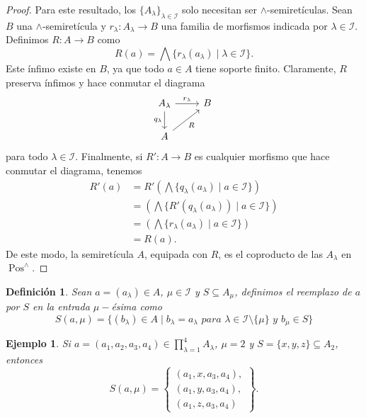 \documentclass[12pt,letterpaper,titlepage]{article}
\newtheorem*{defn}{Definición}
\newtheorem*{exa}{Ejemplo}
\theoremstyle{definition}
\renewcommand\inf{\wedge}
\newcommand\Inf{\bigwedge}
\newcommand\scr[1]{\mathscr{#1}}
\newcommand\<{\langle}
\renewcommand\>{\rangle}
\DeclareMathOperator{\Pos}{Pos}
\begin{document}
\begin{proof}
    Para este resultado, los $\{A_\lambda\}_{\lambda\in\scr I}$
    solo necesitan ser $\inf$-semiretículas.
    Sean $B$ una $\inf$-semiretícula y
    $r_\lambda:A_\lambda\to B$ una familia de morfismos
    indicada por $\lambda\in\scr I$.
    Definimos $R:A\to B$ como
    \[
        R(a) = \Inf\{r_\lambda(a_\lambda) \mid \lambda \in \scr I\}
    .\]
    Este ínfimo existe en $B$, ya que todo $a\in A$ tiene soporte
    finito.
    Claramente, $R$ preserva ínfimos y hace conmutar el diagrama
    \[
        \begin{tikzcd}
            A_\lambda \ar[r,"r_\lambda"] \ar[d,"q_\lambda"']
            & B \\
            A \ar[ur,"R"']
        \end{tikzcd}
    \]
    para todo $\lambda\in \scr I$.
    Finalmente, si $R':A\to B$ es cualquier morfismo
    que hace conmutar el diagrama, tenemos
    \begin{align*}
        R'(a)
        &= R'(\Inf\{q_\lambda(a_\lambda)\mid a\in \scr I\}) \\
        &= (\Inf\{R'(q_\lambda(a_\lambda))\mid a\in \scr I\}) \\
        &= (\Inf\{r_\lambda(a_\lambda)\mid a\in \scr I\}) \\
        &= R(a).
    \end{align*}
    De este modo, la semiretícula $A$, equipada con $R$,
    es el coproducto de las $A_\lambda$ en $\Pos^\inf$.
\end{proof}

\begin{defn}
Sean $a=(a_\lambda)\in A$, $\mu\in\scr I$ y $S\subseteq A_\mu$, definimos el reemplazo de $a$ por $S$ en la entrada $\mu-$ésima como
\[S(a,\mu)=\{(b_\lambda)\in A\mid b_\lambda=a_\lambda\textit{ para }\lambda\in\scr I\setminus \{\mu\}\textit{ y }b_\mu\in S\}\]
\end{defn}
\begin{exa}
Si $a=(a_1,a_2,a_3,a_4)\in\prod_{\lambda=1}^4A_\lambda$, $\mu=2$ y $S=\{x,y,z\}\subseteq A_2$, entonces
    \[
      S(a,\mu) = \left\{
      \begin{array}{c}
        (a_1,x,a_3,a_4), \\
        (a_1,y,a_3,a_4), \\
        (a_1,z,a_3,a_4)
      \end{array}
      \right\}
    .\]
\end{exa}
\end{document}
